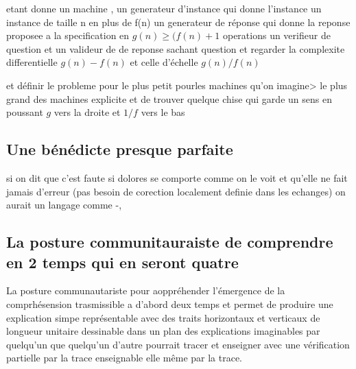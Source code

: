 \documentclass{article}
\begin{document}
 etant donne un machine , un generateur d'instance qui donne l'instance un instance de taille n en plus de f(n) 
 un generateur de réponse qui donne la reponse proposee a la specification en  $g(n)\ge(f(n)+1$ operations
 un verifieur de question et un valideur de de reponse sachant question
 et regarder la complexite differentielle $g(n)-f(n)$ et celle d'échelle $g(n)/f(n)$
  
  et définir le probleme pour le plus petit pourles machines qu'on imagine> le plus grand des machines explicite
  et de trouver quelque chise qui garde un sens en poussant $g$ vers la droite et $1/f$ vers le bas
  
  \subsection{Une bénédicte presque parfaite}
  si on dit que c'est faute si  dolores se comporte comme on le voit
   et qu'elle ne fait jamais d'erreur (pas besoin de corection localement definie dans les echanges)
   on aurait un langage comme -,
    
    
  
  
  
 
 
 \subsection{La posture communitauraiste de comprendre en 2 temps qui en seront quatre}
 
 La posture communautariste pour aoppréhender l'émergence de la comprhésension trasmissible a d'abord deux temps et permet de  produire  une explication simpe  représentable avec des traits horizontaux et verticaux de longueur unitaire dessinable dans un plan des explications imaginables par quelqu'un que quelqu'un d'autre pourrait tracer et enseigner  avec une vérification partielle par la trace enseignable elle même par la trace.
 
\end{document}
